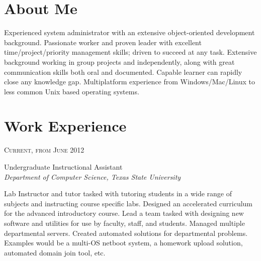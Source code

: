 \documentclass[10pt]{article} %
\begin{document}
\begin{minipage}[t]{0.5\textwidth} %
\vspace{0pt} %
	
\section{About Me}
Experienced system administrator with an extensive object-oriented development background. Passionate worker and proven leader with excellent 
time/project/priority management skills; driven to succeed at any task. Extensive background working in group projects and independently, along with 
great communication skills both oral and documented. Capable learner can rapidly close any  knowledge gap. Multiplatform experience from 
Windows/Mac/Linux to less common Unix based operating systems.


\section{Work Experience} 


{\raggedleft\textsc{Current, from June 2012}\par}

{\raggedright\large Undergraduate Instructional Assistant\\
\textit{Department of Computer Science, Texas State University}\\[5pt]}

\normalsize{Lab Instructor and tutor tasked with tutoring students in a wide range of subjects and instructing course specific labs. Designed an accelerated curriculum for the advanced introductory course. Lead a team tasked with designing new software and utilities for use by faculty, staff, and students. Managed multiple departmental servers. Created automated solutions for departmental problems. Examples would be a multi-OS netboot system, a homework upload solution, automated domain join tool, etc.}\\


\end{minipage}
\end{document}
